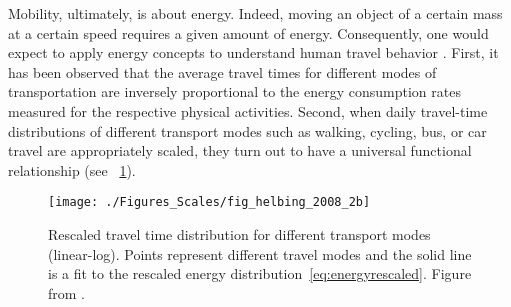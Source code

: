 Mobility, ultimately, is about energy. Indeed, moving an object of a certain mass at a certain speed requires a given amount of energy. Consequently, one would expect to apply energy concepts to understand human travel behavior \cite{kolbl_2003_energy}. First, it has been observed that the average travel times for different modes of transportation are inversely proportional to the energy consumption rates measured for the respective physical activities. Second, when daily travel-time distributions of different transport modes such as walking, cycling, bus, or car travel are appropriately scaled, they turn out to have a universal functional relationship (see \figurename~\ref{fig:helbing2}). 

\begin{figure}[t!]
  \centering
\texttt{[image: ./Figures\_Scales/fig\_helbing\_2008\_2b]}
  \caption{Rescaled travel time distribution for different transport modes (linear-log). Points represent different travel modes and the solid line is a fit to the rescaled energy distribution~\eqref{eq:energyrescaled}. Figure from \cite{kolbl_2003_energy}.}
\label{fig:helbing2}
\end{figure}


